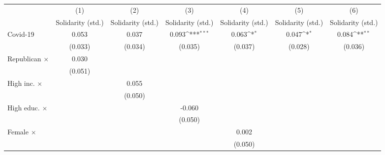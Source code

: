 {
\def\sym#1{\ifmmode^{#1}\else\(^{#1}\)\fi}
\begin{tabular}{l*{6}{c}}
\toprule
                    &\multicolumn{1}{c}{(1)}&\multicolumn{1}{c}{(2)}&\multicolumn{1}{c}{(3)}&\multicolumn{1}{c}{(4)}&\multicolumn{1}{c}{(5)}&\multicolumn{1}{c}{(6)}\\
                    &\multicolumn{1}{c}{Solidarity (std.)}&\multicolumn{1}{c}{Solidarity (std.)}&\multicolumn{1}{c}{Solidarity (std.)}&\multicolumn{1}{c}{Solidarity (std.)}&\multicolumn{1}{c}{Solidarity (std.)}&\multicolumn{1}{c}{Solidarity (std.)}\\
\midrule
Covid-19            &       0.053         &       0.037         &       0.093\sym{***}&       0.063\sym{*}  &       0.047\sym{*}  &       0.084\sym{**} \\
                    &     (0.033)         &     (0.034)         &     (0.035)         &     (0.037)         &     (0.028)         &     (0.036)         \\
\addlinespace
Republican $\times$ &       0.030         &                     &                     &                     &                     &                     \\
                    &     (0.051)         &                     &                     &                     &                     &                     \\
\addlinespace
High inc. $\times$  &                     &       0.055         &                     &                     &                     &                     \\
                    &                     &     (0.050)         &                     &                     &                     &                     \\
\addlinespace
High educ. $\times$ &                     &                     &      -0.060         &                     &                     &                     \\
                    &                     &                     &     (0.050)         &                     &                     &                     \\
\addlinespace
Female $\times$     &                     &                     &                     &       0.002         &                     &                     \\
                    &                     &                     &                     &     (0.050)         &                     &                     \\

\end{tabular}}
